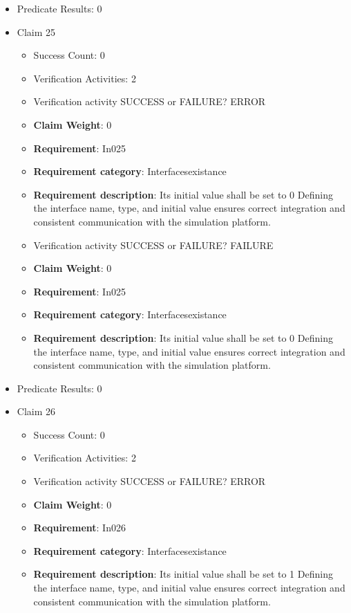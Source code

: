 \documentclass{article}
\begin{document}
\begin{itemize}
									    
				\item Predicate Results: 0

  				  \item Claim 25
				\begin{itemize}
			    	\item Success Count: 0 
			    	\item Verification Activities: 2
					\item Verification activity SUCCESS or FAILURE? ERROR
					\item \textbf{Claim Weight}: 0
						\item \textbf{Requirement}: In025 
						\item \textbf{Requirement category}: Interfacesexistance 
						\item \textbf{Requirement description}: Its initial value shall be set to 0 Defining the interface name, type, and initial value ensures correct integration and consistent communication with the simulation platform.
					
					\item Verification activity SUCCESS or FAILURE? FAILURE
					\item \textbf{Claim Weight}: 0
						\item \textbf{Requirement}: In025 
						\item \textbf{Requirement category}: Interfacesexistance 
						\item \textbf{Requirement description}: Its initial value shall be set to 0 Defining the interface name, type, and initial value ensures correct integration and consistent communication with the simulation platform.
					
				\end{itemize}
				
									    
				\item Predicate Results: 0

  				  \item Claim 26
				\begin{itemize}
			    	\item Success Count: 0 
			    	\item Verification Activities: 2
					\item Verification activity SUCCESS or FAILURE? ERROR
					\item \textbf{Claim Weight}: 0
						\item \textbf{Requirement}: In026 
						\item \textbf{Requirement category}: Interfacesexistance 
						\item \textbf{Requirement description}: Its initial value shall be set to 1 Defining the interface name, type, and initial value ensures correct integration and consistent communication with the simulation platform.
					

\end{itemize}
\end{itemize}
\end{document}
